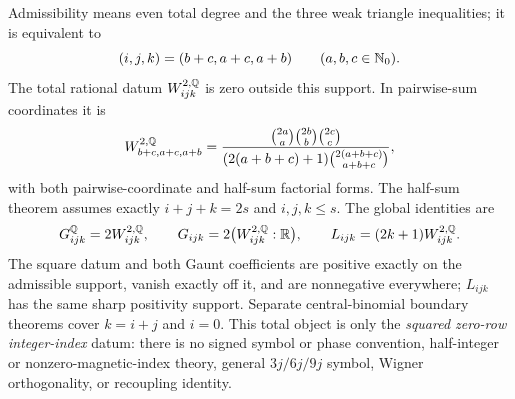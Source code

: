 \documentclass[11pt,oneside]{article}
\theoremstyle{definition}
\theoremstyle{remark}
\begin{document}
Admissibility means even total degree and the three weak triangle inequalities; it is
equivalent to
\[
 (i,j,k)=(b+c,a+c,a+b)
 \qquad(a,b,c\in\mathbb{N}_{0}).
\]
The total rational datum \(W_{ijk}^{2,\mathbb{Q}}\) is zero outside this support.
In pairwise-sum coordinates it is
\[
 W_{b+c,a+c,a+b}^{2,\mathbb{Q}}
 =\frac{\binom{2a}{a}\binom{2b}{b}\binom{2c}{c}}
 {(2(a+b+c)+1)\binom{2(a+b+c)}{a+b+c}},
\]
with both pairwise-coordinate and half-sum factorial forms.  The half-sum theorem assumes
exactly \(i+j+k=2s\) and \(i,j,k\leq s\).  The global identities are
\[
 G_{ijk}^{\mathbb{Q}}=2W_{ijk}^{2,\mathbb{Q}},
 \qquad
 G_{ijk}=2\bigl(W_{ijk}^{2,\mathbb{Q}}:\mathbb{R}\bigr),
 \qquad
 L_{ijk}=(2k+1)W_{ijk}^{2,\mathbb{Q}}.
\]
The square datum and both Gaunt coefficients are positive exactly on the admissible
support, vanish exactly off it, and are nonnegative everywhere; \(L_{ijk}\) has the
same sharp positivity support.  Separate central-binomial boundary theorems cover
\(k=i+j\) and \(i=0\).  This total object is only the \emph{squared zero-row
integer-index} datum: there is no signed symbol or phase convention, half-integer or
nonzero-magnetic-index theory, general \(3j/6j/9j\) symbol, Wigner orthogonality, or
recoupling identity.
\end{document}
